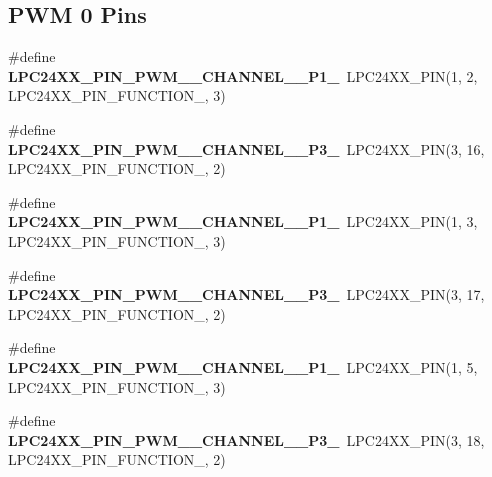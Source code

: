 \subsection*{P\+WM 0 Pins}
\begin{DoxyCompactItemize}
\item 
\mbox{\label{group__lpc24xx__io_gaa0c33dbd8ced301bd589921ee9b75c4f}} 
\#define {\bfseries L\+P\+C24\+X\+X\+\_\+\+P\+I\+N\+\_\+\+P\+W\+M\+\_\+\_\+\+C\+H\+A\+N\+N\+E\+L\+\_\+\_\+\+P1\+\_}~L\+P\+C24\+X\+X\+\_\+\+P\+IN(1, 2, L\+P\+C24\+X\+X\+\_\+\+P\+I\+N\+\_\+\+F\+U\+N\+C\+T\+I\+O\+N\+\_, 3)
\item 
\mbox{\label{group__lpc24xx__io_gae42498053889cfcfb29bdb75744161bb}} 
\#define {\bfseries L\+P\+C24\+X\+X\+\_\+\+P\+I\+N\+\_\+\+P\+W\+M\+\_\+\_\+\+C\+H\+A\+N\+N\+E\+L\+\_\+\_\+\+P3\+\_}~L\+P\+C24\+X\+X\+\_\+\+P\+IN(3, 16, L\+P\+C24\+X\+X\+\_\+\+P\+I\+N\+\_\+\+F\+U\+N\+C\+T\+I\+O\+N\+\_, 2)
\item 
\mbox{\label{group__lpc24xx__io_gaad2a0e4705120d8266acaef517ffa647}} 
\#define {\bfseries L\+P\+C24\+X\+X\+\_\+\+P\+I\+N\+\_\+\+P\+W\+M\+\_\+\_\+\+C\+H\+A\+N\+N\+E\+L\+\_\+\_\+\+P1\+\_}~L\+P\+C24\+X\+X\+\_\+\+P\+IN(1, 3, L\+P\+C24\+X\+X\+\_\+\+P\+I\+N\+\_\+\+F\+U\+N\+C\+T\+I\+O\+N\+\_, 3)
\item 
\mbox{\label{group__lpc24xx__io_ga0d3670a2a7c7e075af0250f6c51ffeec}} 
\#define {\bfseries L\+P\+C24\+X\+X\+\_\+\+P\+I\+N\+\_\+\+P\+W\+M\+\_\+\_\+\+C\+H\+A\+N\+N\+E\+L\+\_\+\_\+\+P3\+\_}~L\+P\+C24\+X\+X\+\_\+\+P\+IN(3, 17, L\+P\+C24\+X\+X\+\_\+\+P\+I\+N\+\_\+\+F\+U\+N\+C\+T\+I\+O\+N\+\_, 2)
\item 
\mbox{\label{group__lpc24xx__io_ga2eedb487c391973718d7c6d3de74ca47}} 
\#define {\bfseries L\+P\+C24\+X\+X\+\_\+\+P\+I\+N\+\_\+\+P\+W\+M\+\_\+\_\+\+C\+H\+A\+N\+N\+E\+L\+\_\+\_\+\+P1\+\_}~L\+P\+C24\+X\+X\+\_\+\+P\+IN(1, 5, L\+P\+C24\+X\+X\+\_\+\+P\+I\+N\+\_\+\+F\+U\+N\+C\+T\+I\+O\+N\+\_, 3)
\item 
\mbox{\label{group__lpc24xx__io_gaf30fda9d9732dfaa3a9ac752d0eed6bf}} 
\#define {\bfseries L\+P\+C24\+X\+X\+\_\+\+P\+I\+N\+\_\+\+P\+W\+M\+\_\+\_\+\+C\+H\+A\+N\+N\+E\+L\+\_\+\_\+\+P3\+\_}~L\+P\+C24\+X\+X\+\_\+\+P\+IN(3, 18, L\+P\+C24\+X\+X\+\_\+\+P\+I\+N\+\_\+\+F\+U\+N\+C\+T\+I\+O\+N\+\_, 2)

\end{DoxyCompactItemize}
